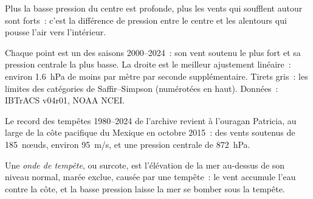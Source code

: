 Plus la basse pression du centre est profonde, plus les vents qui soufflent
autour sont forts~: c'est la différence de pression entre le centre et les
alentours qui pousse l'air vers l'intérieur.

\begin{omfigure}

{\small Chaque point est un  des saisons 2000--2024~: son
vent soutenu le plus fort et sa pression centrale la plus basse. La droite
est le meilleur ajustement linéaire~: environ \qty{1.6}{hPa} de moins par
mètre par seconde supplémentaire. Tirets gris~: les limites des catégories
de Saffir--Simpson (numérotées en haut). Données~: IBTrACS v04r01, NOAA
NCEI.}
\end{omfigure}

Le record des tempêtes 1980--2024 de l'archive revient à l'ouragan
Patricia, au large de la côte pacifique du Mexique en octobre 2015~: des
vents soutenus de 185~nœuds, environ \qty{95}{m/s}, et une pression centrale
de \qty{872}{hPa}.

\begin{definition}\label{def:g10:storms-and-cyclones:storm-surge}
Une \emph{onde de tempête}, ou
surcote, est l'élévation de la mer au-dessus de son niveau normal, marée
exclue, causée par une tempête~: le vent accumule l'eau contre la côte, et
la basse pression laisse la mer se bomber sous la tempête.
\end{definition}

